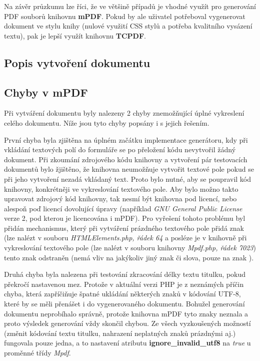 \par
Na závěr průzkumu lze říci, že ve většině případů je vhodné využít pro generování PDF souborů knihovnu \textbf{mPDF}. Pokud by ale uživatel potřeboval vygenerovat dokument ve stylu knihy (nulové využití CSS stylů a potřeba kvalitního vysázení textu), pak je lepší využít knihovnu \textbf{TCPDF}. 

\subsection{Popis vytvoření dokumentu}

\subsection{Chyby v mPDF}
Při vytváření dokumentu byly nalezeny 2 chyby znemožňující úplné vykreslení celého dokumentu. Níže jsou tyto chyby popsány i s jejich řešením.
\par
První chyba byla zjištěna na úplném začátku implementace generátoru, kdy při vkládání textových polí do formuláře se po přeložení kódu nevytvořil žádný dokument. Při zkoumání zdrojového kódu knihovny a vytvoření pár testovacích dokumentů bylo žjištěno, že knihovna neumožňuje vytvořit textové pole pokud se při jeho vytvoření nezadá vkládaný text. Proto bylo nutné, aby se poupravil kód knihovny, konkrétněji ve vykreslování textového pole. Aby bylo možno takto upravovat zdrojový kód knihovny, tak nesmí být knihovna pod licencí, nebo alespoň poď licencí dovolující úpravy (například \textit{GNU General Public License} verze 2, pod kterou je licencována i mPDF). Pro vyřešení tohoto problému byl přidán mechanismus, který při vytváření prázdného textového pole přidá znak  (lze nalézt v souboru \textit{HTMLElements.php, řádek 64} a posléze je v knihovně při vykreslování textového pole (lze nalézt v souboru knihovny \textit{Mpdf.php, řádek 7023}) tento znak odstraněn (nemá vliv na jakýkoliv jiný znak či slova, pouze na znak ).
\par
Druhá chyba byla nalezena při testování zkracování délky textu titulku, pokud překročí nastavenou mez. Protože v aktuální verzi PHP je z neznámých příčin chyba, která zapříčiňuje špatné ukládání některých znaků v kódování UTF-8, které by se měli přenášet i do vygenerovaného dokumentu. Bohužel generování dokumentu neprobíhalo správně, protože knihovna mPDF tyto znaky neznala a proto výsledek generování vždy skončil chybou. Ze všech vyzkoušených možností (změnit kódování textu titulku, nahrazení neplatných znaků prázdnými aj.) fungovala pouze jedna, a to nastavení atributu \textbf{ignore\_invalid\_utf8} na \textit{true} u proměnné třídy \textit{Mpdf}.

